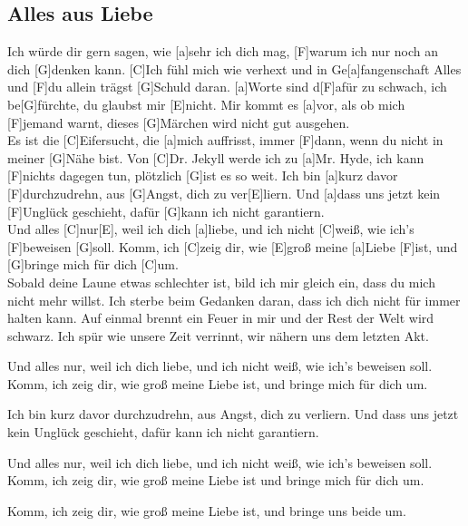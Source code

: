\documentclass[10pt,a5paper,twoside, cleardoubleplain]{scrbook}
\begin{document}
\newpage  
  	

\subsection{Alles aus Liebe}
\begin{guitar}
[C]Ich würde dir gern sagen, wie [a]sehr ich dich mag, 
[F]warum ich nur noch an dich [G]denken kann.
[C]Ich fühl mich wie verhext und in Ge[a]fangenschaft
Alles und [F]du allein trägst [G]Schuld daran.
[a]Worte sind d[F]afür zu schwach,
ich be[G]fürchte, du glaubst mir [E]nicht.
Mir kommt es [a]vor, als ob mich [F]jemand warnt,
dieses [G]Märchen wird nicht gut ausgehen.
\\
Es ist die [C]Eifersucht, die [a]mich auffrisst,
immer [F]dann, wenn du nicht in meiner [G]Nähe bist.
Von [C]Dr. Jekyll werde ich zu [a]Mr. Hyde,
ich kann [F]nichts dagegen tun, plötzlich [G]ist es so weit.
Ich bin [a]kurz davor [F]durchzudrehn, aus [G]Angst, dich zu ver[E]liern.
Und [a]dass uns jetzt kein [F]Unglück geschieht, dafür [G]kann ich nicht garantiern.
\\
Und alles [C]nur[E], weil ich dich [a]liebe, 
und ich nicht [C]weiß, wie ich's [F]beweisen [G]soll.
Komm, ich [C]zeig dir, wie [E]groß meine [a]Liebe [F]ist, 
und [G]bringe mich für dich [C]um.
\\
Sobald deine Laune etwas schlechter ist,
bild ich mir gleich ein, dass du mich nicht mehr willst.
Ich sterbe beim Gedanken daran,
dass ich dich nicht für immer halten kann.
Auf einmal brennt ein Feuer in mir
und der Rest der Welt wird schwarz.
Ich spür wie unsere Zeit verrinnt,
wir nähern uns dem letzten Akt.

Und alles nur, weil ich dich liebe,
und ich nicht weiß, wie ich's beweisen soll.
Komm, ich zeig dir, wie groß meine Liebe ist,
und bringe mich für dich um.

Ich bin kurz davor durchzudrehn,
aus Angst, dich zu verliern.
Und dass uns jetzt kein Unglück geschieht,
dafür kann ich nicht garantiern.

Und alles nur, weil ich dich liebe,
und ich nicht weiß, wie ich's beweisen soll.
Komm, ich zeig dir, wie groß meine Liebe ist
und bringe mich für dich um.

Komm, ich zeig dir, wie groß meine Liebe ist,
und bringe uns beide um.
\end{guitar}

  	
\newpage  
 	
\end{document}
